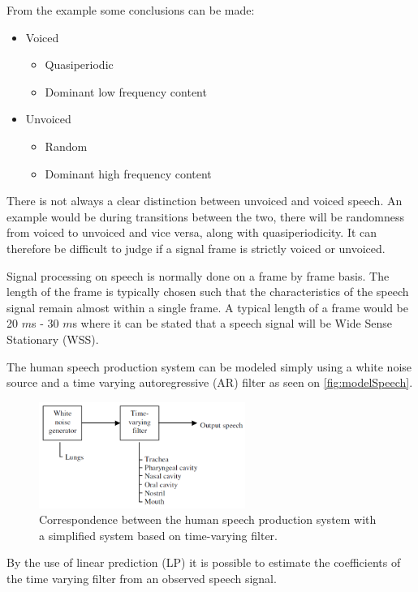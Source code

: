 From the example some conclusions can be made:
\begin{itemize}
\item Voiced
	\begin{itemize}
	\item Quasiperiodic
	\item Dominant low frequency content
	\end{itemize}
\item Unvoiced
	\begin{itemize}
	\item Random 
	\item Dominant high frequency content
	\end{itemize}
\end{itemize}


There is not always a clear distinction between unvoiced and voiced speech. An example would be during transitions between the two, there will be randomness from voiced to unvoiced and vice versa, along with quasiperiodicity. It can therefore be difficult to judge if a signal frame is strictly voiced or unvoiced. 

Signal processing on speech is normally done on a frame by frame basis. The length of the frame is typically chosen such that the characteristics of the speech signal remain almost within a single frame. A typical length of a frame would be 20 $m$s - 30 $m$s where it can be stated that a speech signal will be Wide Sense Stationary (WSS).  

The human speech production system can be modeled simply using a white noise source and a time varying autoregressive (AR) filter as seen on \autoref{fig:modelSpeech}. 

\begin{figure}[H]
	\centering
	\includegraphics[width=0.6\textwidth]{figures/Speech/modelSpeech}
	\caption{Correspondence between the human speech production system with a simplified system based on time-varying filter.}
	\label{fig:modelSpeech}
\end{figure}      

By the use of linear prediction (LP) it is possible to estimate the coefficients of the time varying filter from an observed speech signal. 


